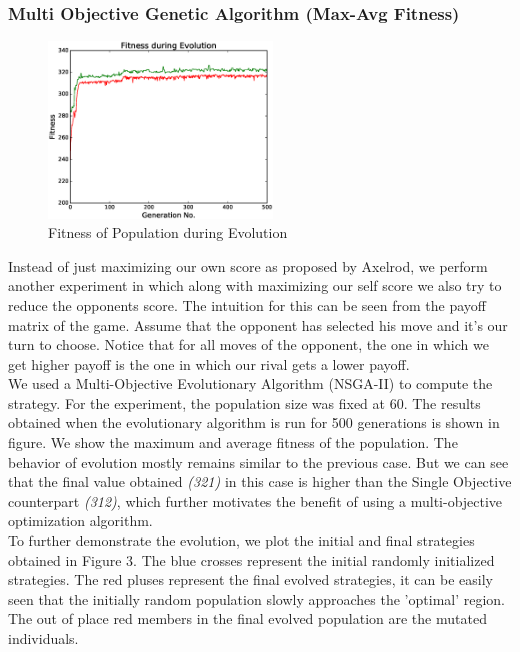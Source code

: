 \documentclass[a4paper]{article}
\begin{document}
	\subsubsection{Multi Objective Genetic Algorithm (Max-Avg Fitness)}
		
	\begin{figure}
	\centering
	\includegraphics[width=0.53\textwidth]{multFitPlot.eps}
	\caption{\footnotesize{Fitness of Population during Evolution}}
	\end{figure}
	Instead of just maximizing our own score as proposed by Axelrod, we perform another experiment in which along with maximizing our self score we also try to reduce the opponents score. The intuition for this can be seen from the payoff matrix of the game. Assume that the opponent has selected his move and it's our turn to choose. Notice that for all moves of the opponent, the one in which we get higher payoff is the one in which our rival gets a lower payoff.\\
	We used a Multi-Objective Evolutionary Algorithm (NSGA-II) to compute the strategy. For the experiment, the population size was fixed at 60. The results obtained when the evolutionary algorithm is run for 500 generations is shown in figure. We show the maximum and average fitness of the population. The behavior of evolution mostly remains similar to the previous case. But we can see that the final value obtained \textit{(321)} in this case is higher than the Single Objective counterpart \textit{(312)}, which further motivates the benefit of using a multi-objective optimization algorithm.\\

	To further demonstrate the evolution, we plot the initial and final strategies obtained in Figure 3. The blue crosses represent the initial randomly initialized strategies. The red pluses represent the final evolved strategies, it can be easily seen that the initially random population slowly approaches the 'optimal' region. The out of place red members in the final evolved population are the mutated individuals.
\end{document}

